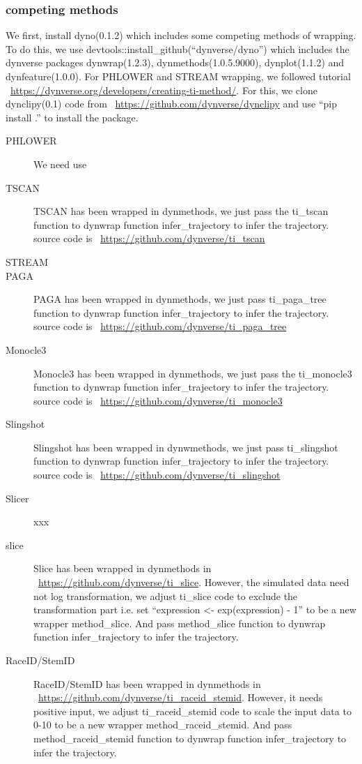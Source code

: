 \subsubsection{competing methods}
	We first, install dyno(0.1.2) which includes some competing methods of wrapping. To do this, we use devtools::install\_github(``dynverse/dyno'') which includes the dynverse packages dynwrap(1.2.3),  dynmethods(1.0.5.9000), dynplot(1.1.2) and dynfeature(1.0.0). For PHLOWER and STREAM wrapping, we followed tutorial ~\url{https://dynverse.org/developers/creating-ti-method/}. For this, we clone dynclipy(0.1) code from ~\url{https://github.com/dynverse/dynclipy} and use ``pip install .'' to install the package.
\begin{description}
	\item[PHLOWER]
	We need use 
	\item[TSCAN]
	TSCAN has been wrapped in dynmethods, we just pass the ti\_tscan function to dynwrap function infer\_trajectory to infer the trajectory. source code is ~\url{https://github.com/dynverse/ti\_tscan}
	\item[STREAM]
	\item[PAGA] 
	PAGA has been wrapped in dynmethods, we just pass ti\_paga\_tree function to dynwrap function infer\_trajectory to infer the trajectory. source code is ~\url{https://github.com/dynverse/ti\_paga\_tree}
	\item[Monocle3]
	Monocle3 has been wrapped in dynmethods, we just pass the ti\_monocle3 function to dynwrap function infer\_trajectory to infer the trajectory. source code is ~\url{https://github.com/dynverse/ti\_monocle3}
	\item[Slingshot]
	Slingshot has been wrapped in dynwmethods, we just pass ti\_slingshot function to dynwrap function infer\_trajectory to infer the trajectory. source code is ~\url{https://github.com/dynverse/ti\_slingshot}
	\item[Slicer]
	xxx
	\item[slice]
	Slice has been wrapped in dynmethods in ~\url{https://github.com/dynverse/ti\_slice}. However, the simulated data need not log transformation, we adjust ti\_slice code to exclude the transformation part i.e. set ``expression <- exp(expression) - 1'' to be a new wrapper method\_slice. And pass method\_slice function to dynwrap function infer\_trajectory to infer the trajectory.
	\item[RaceID/StemID]
	RaceID/StemID has been wrapped in dynmethods in ~\url{https://github.com/dynverse/ti\_raceid\_stemid}. However, it needs positive input, we adjust ti\_raceid\_stemid code to scale the input data to 0-10 to be a new wrapper method\_raceid\_stemid. And pass method\_raceid\_stemid function to dynwrap function infer\_trajectory to infer the trajectory.

\end{description}
